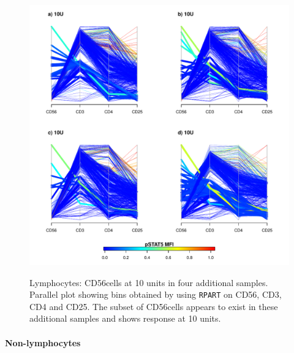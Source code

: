 \begin{figure}
\begin{minipage}{.65\textwidth}
\includegraphics[width=\linewidth]{figures/lymphocytes-newsamples-cd56bright-10U}
\end{minipage}
\begin{minipage}{.3\textwidth}
{ Lymphocytes: CD56\high cells at 10 units in four additional samples.  }
{
Parallel plot showing bins obtained by using \texttt{RPART} on CD56, CD3, CD4 and CD25.
The subset of CD56\high cells appears to exist in these additional samples and shows response at 10 units.
}
\end{minipage}
\end{figure}

\clearpage

\paragraph{Non-lymphocytes}

